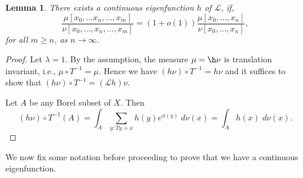 \documentclass[11pt, a4paper]{amsart}
\newtheorem{lem}[thm]{Lemma}
\theoremstyle{definition}
\theoremstyle{remark}
\def\X{X}
\begin{document}
\begin{lem}
  There exists a continuous eigenfunction $h$ of ${\mathcal L}$, if,
$$\frac{\mu[x_0,\ldots x_n, \ldots, x_m]}{\nu[x_0,\ldots, x_n, \ldots, x_m]}=(1+o(1)) \frac{\mu[x_0,\ldots, x_n]}{\nu[x_0, \ldots, x_n]},$$
for all $m\geq n$, as $n\to \infty$.
\end{lem}
\begin{proof}
  Let $\lambda=1$. By the assumption, the measure $\mu= \h \nu$ is translation
  invariant, i.e., $\mu\circ T^{-1}=\mu$. Hence we have
  $(h\nu)\circ T^{-1}=h\nu$ and it suffices to show that
  $(h\nu)\circ T^{-1}=({\mathcal L}h)\nu$.

  Let $A$ be any Borel subset of $\X$. Then
  $$(h\nu)\circ T^{-1} (A)=\int_A \sum_{y: Ty=x} h(y)e^{\phi(y)}\; d\nu(x)=\int_A h(x)\; d\nu(x).$$
\end{proof}

\noindent
We now fix some notation before proceeding to prove that we have a continuous
eigenfunction. \newline
\end{document}
